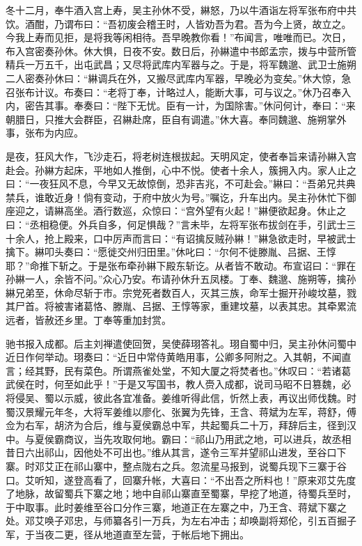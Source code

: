 冬十二月，奉牛酒入宫上寿，吴主孙休不受，綝怒，乃以牛酒诣左将军张布府中共饮。酒酣，乃谓布曰：“吾初废会稽王时，人皆劝吾为君。吾为今上贤，故立之。今我上寿而见拒，是将我等闲相待。吾早晚教你看！”布闻言，唯唯而已。次日，布入宫密奏孙休。休大惧，日夜不安。数日后，孙綝遣中书郎孟宗，拨与中营所管精兵一万五千，出屯武昌；又尽将武库内军器与之。于是，将军魏邈、武卫士施朔二人密奏孙休曰：“綝调兵在外，又搬尽武库内军器，早晚必为变矣。”休大惊，急召张布计议。布奏曰：“老将丁奉，计略过人，能断大事，可与议之。”休乃召奉入内，密告其事。奉奏曰：“陛下无忧。臣有一计，为国除害。”休问何计，奉曰：“来朝腊日，只推大会群臣，召綝赴席，臣自有调遣。”休大喜。奉同魏邈、施朔掌外事，张布为内应。

是夜，狂风大作，飞沙走石，将老树连根拔起。天明风定，使者奉旨来请孙綝入宫赴会。孙綝方起床，平地如人推倒，心中不悦。使者十余人，簇拥入内。家人止之曰：“一夜狂风不息，今早又无故惊倒，恐非吉兆，不可赴会。”綝曰：“吾弟兄共典禁兵，谁敢近身！倘有变动，于府中放火为号。”嘱讫，升车出内。吴主孙休忙下御座迎之，请綝高坐。酒行数巡，众惊曰：“宫外望有火起！”綝便欲起身。休止之曰：“丞相稳便。外兵自多，何足惧哉？”言未毕，左将军张布拔剑在手，引武士三十余人，抢上殿来，口中厉声而言曰：“有诏擒反贼孙綝！”綝急欲走时，早被武士擒下。綝叩头奏曰：“愿徙交州归田里。”休叱曰：“尔何不徙滕胤、吕据、王惇耶？”命推下斩之。于是张布牵孙綝下殿东斩讫。从者皆不敢动。布宣诏曰：“罪在孙綝一人，余皆不问。”众心乃安。布请孙休升五凤楼。丁奉、魏邈、施朔等，擒孙綝兄弟至，休命尽斩于市。宗党死者数百人，灭其三族，命军士掘开孙峻坟墓，戮其尸首。将被害诸葛恪、滕胤、吕据、王惇等家，重建坟墓，以表其忠。其牵累流远者，皆赦还乡里。丁奉等重加封赏。

驰书报入成都。后主刘禅遣使回贺，吴使薛珝答礼。珝自蜀中归，吴主孙休问蜀中近日作何举动。珝奏曰：“近日中常侍黄皓用事，公卿多阿附之。入其朝，不闻直言；经其野，民有菜色。所谓燕雀处堂，不知大厦之将焚者也。”休叹曰：“若诸葛武侯在时，何至如此乎！”于是又写国书，教人赍入成都，说司马昭不日篡魏，必将侵吴、蜀以示威，彼此各宜准备。姜维听得此信，忻然上表，再议出师伐魏。时蜀汉景耀元年冬，大将军姜维以廖化、张翼为先锋，王含、蒋斌为左军，蒋舒，傅佥为右军，胡济为合后，维与夏侯霸总中军，共起蜀兵二十万，拜辞后主，径到汉中。与夏侯霸商议，当先攻取何地。霸曰：“祁山乃用武之地，可以进兵，故丞相昔日六出祁山，因他处不可出也。”维从其言，遂令三军并望祁山进发，至谷口下寨。时邓艾正在祁山寨中，整点陇右之兵。忽流星马报到，说蜀兵现下三寨于谷口。艾听知，遂登高看了，回寨升帐，大喜曰：“不出吾之所料也！”原来邓艾先度了地脉，故留蜀兵下寨之地；地中自祁山寨直至蜀寨，早挖了地道，待蜀兵至时，于中取事。此时姜维至谷口分作三寨，地道正在左寨之中，乃王含、蒋斌下寨之处。邓艾唤子邓忠，与师纂各引一万兵，为左右冲击；却唤副将郑伦，引五百掘子军，于当夜二更，径从地道直至左营，于帐后地下拥出。

